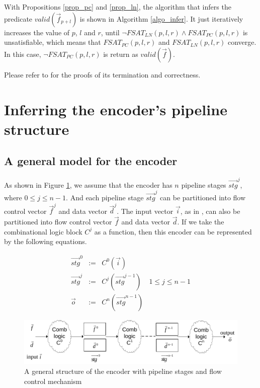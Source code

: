 \documentclass[runningheads,a4paper,orivec]{llncs}
\begin{document}
With Propositions \ref{prop_pc} and \ref{prop_ln},
the algorithm that infers the predicate $valid(\vec{f}_{p+l})$ is shown in 
Algorithm \ref{algo_infer}.
It just iteratively increases the value of $p$, $l$ and $r$, 
until $\neg FSAT_{LN}(p,l,r)\wedge FSAT_{PC}(p,l,r)$ is unsatisfiable,
which means that $FSAT_{PC}(p,l,r)$ and $FSAT_{LN}(p,l,r)$ converge.
In this case,
$\neg FSAT_{PC}(p,l,r)$ is return as $valid(\vec{f})$.

Please refer to \cite{QinTODAES15} for the proofs of its termination and correctness.


\section{Inferring the encoder's pipeline structure}\label{sec_pipeinfer}

\subsection{A general model for the encoder}
As shown in Figure \ref{fig_pipeenc},
we assume that 
the encoder has $n$ pipeline stages $\vec{stg}^j$,
where $0\le j \le n-1$.
And each pipeline stage $\vec{stg}^j$ can be partitioned into flow control vector $\vec{f}^j$ and data vector $\vec{d}^j$.
The input vector $\vec{i}$,
as in \cite{QinTODAES15},
can also be partitioned into flow control vector $\vec{f}$ and data vector $\vec{d}$.
If we take the combinational logic block $C^j$ as a function,
then this encoder can be represented by the following equations.

\begin{equation}\label{equ_genpipe}
\begin{array}{cccc}
\vec{stg}^0   & := & C^0(\vec{i})         &\\
\vec{stg}^j   & := & C^j(\vec{stg}^{j-1}) & 1\le j\le n-1\\
\vec{o}       & := & C^n(\vec{stg}^{n-1}) &
\end{array}
\end{equation}


\begin{figure}[t]
\begin{center}
\includegraphics[width=\textwidth]{pipemod1}
\end{center}
\caption{A general structure of the encoder with pipeline stages and flow control mechanism}
  \label{fig_pipeenc}
\end{figure}
\end{document}
